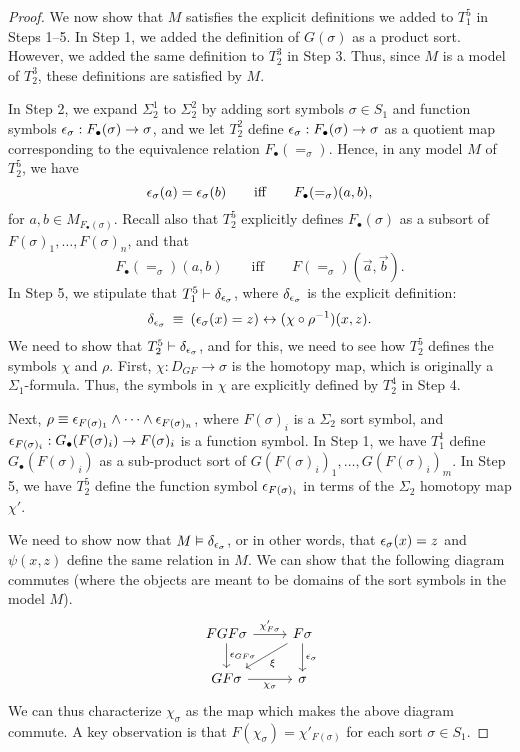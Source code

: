 \begin{proof}
  We now show that $M$ satisfies the explicit definitions we added to
  $T_1^5$ in Steps 1--5.  In Step 1, we added the definition of
  $G(\sigma )$ as a product sort.  However, we added the same
  definition to $T_2^3$ in Step 3.  Thus, since $M$ is a model of
  $T_2^3$, these definitions are satisfied by $M$.

  In Step 2, we expand $\Sigma _2^1$ to $\Sigma _2^2$ by adding sort
  symbols $\sigma\in S_1$ and function symbols
  $\epsilon _\sigma :F_\bullet (\sigma )\to \sigma$, and we let $T_2^2$
  define $\epsilon _\sigma :F_\bullet (\sigma )\to \sigma$ as a quotient
  map corresponding to the equivalence relation
  $F_\bullet (=_\sigma )$.  Hence, in any model $M$ of $T_2^5$, we
  have
  \[ \epsilon _{\sigma }(a)=\epsilon _\sigma (b) \qquad \text{iff} \qquad F_\bullet
    (=_\sigma )(a,b) ,\]
  for $a,b\in M_{F_\bullet (\sigma )}$.  Recall also that $T_2^5$
  explicitly defines $F_\bullet (\sigma )$ as a subsort of $F(\sigma
  )_1,\dots ,F(\sigma )_n$, and that
  \[ F_\bullet (=_\sigma )(a,b) \qquad \text{iff} \qquad F(=_\sigma
    )(\vec{a},\vec{b}) .\] In Step 5, we stipulate that
  $T_1^5\vdash \delta _{\epsilon _\sigma }$, where $\delta _{\epsilon _\sigma }$
  is the explicit definition:
  \[ \delta _{\epsilon _\sigma } \:\equiv \: (\epsilon _\sigma (x)=z)\leftrightarrow
    (\chi\circ\rho ^{-1})(x,z) .\] We need to show that
  $T_2^5\vdash \delta _{\epsilon _\sigma }$, and for this, we need to see
  how $T_2^5$ defines the symbols $\chi$ and $\rho$.  First,
  $\chi :D_{GF}\to \sigma$ is the homotopy map, which is originally a
  $\Sigma _1$-formula.  Thus, the symbols in $\chi$ are explicitly
  defined by $T_2^4$ in Step 4.

  Next,
  $\rho \equiv \epsilon _{F(\sigma )_1}\wedge\cdots\wedge \epsilon _{F(\sigma
    )_n}$, where $F(\sigma )_i$ is a $\Sigma _2$ sort symbol, and
  $\epsilon _{F(\sigma )_i}:G_{\bullet}(F(\sigma )_i)\to F(\sigma )_i$ is a
  function symbol.  In Step 1, we have $T_1^1$ define
  $G_{\bullet}(F(\sigma )_i)$ as a sub-product sort of $G(F(\sigma
  )_i)_1,\dots ,G(F(\sigma )_i)_m$.  In Step 5, we have $T_2^5$ define
  the function symbol $\epsilon _{F(\sigma )_i}$ in terms of the $\Sigma
  _2$ homotopy
  map $\chi '$.
  
  We need to show now that $M\vDash \delta _{\epsilon _\sigma }$,
  or in other words, that $\epsilon _\sigma (x)=z$ and $\psi (x,z)$ define
  the same relation in $M$.   We can show that the following diagram
  commutes (where the objects are meant to be domains of the sort
  symbols in the model $M$).
  \[ \begin{tikzcd} FGF\sigma \arrow{d}{\ve _{GF\sigma}}
      \arrow{r}{\chi '_{F\sigma }} & F\sigma
      \arrow{d}{\ve _\sigma } \arrow{ld}{\xi} \\
      GF\sigma \arrow{r}[below]{\chi _\sigma } &
      \sigma \end{tikzcd} \] We can thus characterize $\chi _\sigma$
  as the map which makes the above diagram commute.  A key observation
  is that $F(\chi _\sigma )=\chi '_{F(\sigma )}$ for each sort
  $\sigma\in S_1$.
\end{proof}


